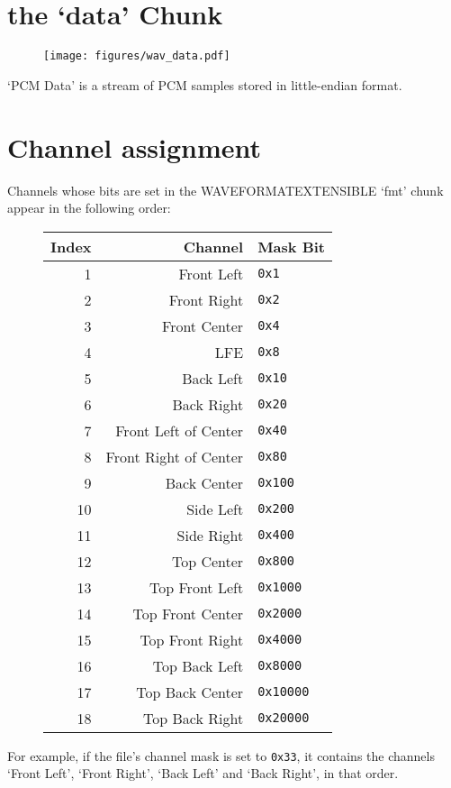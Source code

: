 \section{the `data' Chunk}
\begin{figure}[h]
\texttt{[image: figures/wav\_data.pdf]}
\end{figure}
\par
\noindent
`PCM Data' is a stream of PCM samples stored in little-endian format.

\pagebreak

\section{Channel assignment}
Channels whose bits are set in the WAVEFORMATEXTENSIBLE `fmt' chunk
appear in the following order:
\begin{figure}[h]
\begin{tabular}{| r | r | l |}
\hline
Index & Channel & Mask Bit \\
\hline
1 & Front Left & \texttt{0x1} \\
2 & Front Right & \texttt{0x2} \\
3 & Front Center & \texttt{0x4} \\
4 & LFE & \texttt{0x8} \\
5 & Back Left & \texttt{0x10} \\
6 & Back Right & \texttt{0x20} \\
7 & Front Left of Center & \texttt{0x40} \\
8 & Front Right of Center & \texttt{0x80} \\
9 & Back Center & \texttt{0x100} \\
10 & Side Left & \texttt{0x200} \\
11 & Side Right & \texttt{0x400} \\
12 & Top Center & \texttt{0x800} \\
13 & Top Front Left & \texttt{0x1000} \\
14 & Top Front Center & \texttt{0x2000} \\
15 & Top Front Right & \texttt{0x4000} \\
16 & Top Back Left & \texttt{0x8000} \\
17 & Top Back Center & \texttt{0x10000} \\
18 & Top Back Right & \texttt{0x20000} \\
\hline
\end{tabular}
\end{figure}
\par
\noindent
For example, if the file's channel mask is set to \texttt{0x33},
it contains the channels `Front Left', `Front Right',
`Back Left' and `Back Right', in that order.

